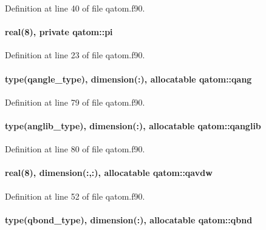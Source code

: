 Definition at line 40 of file qatom.\-f90.

\hypertarget{classqatom_a895c809a1075c6a8114729f30cea7d59}{
\paragraph[{pi}]{\setlength{\rightskip}{0pt plus 5cm}real(8), private qatom\-::pi\hspace{0.3cm}{\ttfamily [private]}}}\label{classqatom_a895c809a1075c6a8114729f30cea7d59}


Definition at line 23 of file qatom.\-f90.

\hypertarget{classqatom_ac67c4e289c7027f5966b90f8c449cc7c}{
\paragraph[{qang}]{\setlength{\rightskip}{0pt plus 5cm}type({\bf qangle\-\_\-type}), dimension(\-:), allocatable qatom\-::qang}}\label{classqatom_ac67c4e289c7027f5966b90f8c449cc7c}


Definition at line 79 of file qatom.\-f90.

\hypertarget{classqatom_a9a304992d62b752bdc4ea9e236e9d496}{
\paragraph[{qanglib}]{\setlength{\rightskip}{0pt plus 5cm}type(anglib\-\_\-type), dimension(\-:), allocatable qatom\-::qanglib}}\label{classqatom_a9a304992d62b752bdc4ea9e236e9d496}


Definition at line 80 of file qatom.\-f90.

\hypertarget{classqatom_ac9881de6ce1fc95c2451db03f280b3fc}{
\paragraph[{qavdw}]{\setlength{\rightskip}{0pt plus 5cm}real(8), dimension(\-:,\-:), allocatable qatom\-::qavdw}}\label{classqatom_ac9881de6ce1fc95c2451db03f280b3fc}


Definition at line 52 of file qatom.\-f90.

\hypertarget{classqatom_ac7698e27cffcd0d73aa5d9f2d63be5df}{
\paragraph[{qbnd}]{\setlength{\rightskip}{0pt plus 5cm}type({\bf qbond\-\_\-type}), dimension(\-:), allocatable qatom\-::qbnd}}\label{classqatom_ac7698e27cffcd0d73aa5d9f2d63be5df}


